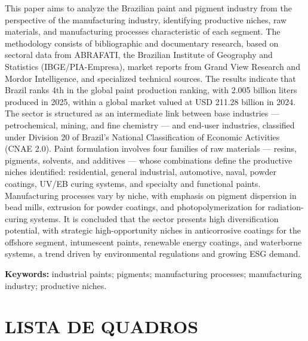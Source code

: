 \documentclass[
  12pt,
  a4paper,
  oneside,
  brazil,
  chapter=TITLE
]{article}
\makeatletter
\newcommand{\secbreak}{\clearpage}
\let\oldsection\section
\renewcommand{\section}{\secbreak\oldsection}
\renewcommand{\listofquadros}{%
  \section*{LISTA DE QUADROS}%
  \@starttoc{loq}%
}
\makeatother
\begin{document}
\vspace{1em}
\noindent
This paper aims to analyze the Brazilian paint and pigment industry from the perspective of
the manufacturing industry, identifying productive niches, raw materials, and manufacturing
processes characteristic of each segment. The methodology consists of bibliographic and
documentary research, based on sectoral data from ABRAFATI, the Brazilian Institute of
Geography and Statistics (IBGE/PIA-Empresa), market reports from Grand View Research and
Mordor Intelligence, and specialized technical sources. The results indicate that Brazil
ranks 4th in the global paint production ranking, with 2.005 billion liters produced in 2025,
within a global market valued at USD 211.28 billion in 2024. The sector is structured as an
intermediate link between base industries --- petrochemical, mining, and fine chemistry --- and
end-user industries, classified under Division 20 of Brazil's National Classification of
Economic Activities (CNAE 2.0). Paint formulation involves four families of raw materials ---
resins, pigments, solvents, and additives --- whose combinations define the productive niches
identified: residential, general industrial, automotive, naval, powder coatings, UV/EB curing
systems, and specialty and functional paints. Manufacturing processes vary by niche, with
emphasis on pigment dispersion in bead mills, extrusion for powder coatings, and
photopolymerization for radiation-curing systems. It is concluded that the sector presents
high diversification potential, with strategic high-opportunity niches in anticorrosive
coatings for the offshore segment, intumescent paints, renewable energy coatings, and
waterborne systems, a trend driven by environmental regulations and growing ESG demand.

\vspace{1em}
\noindent\textbf{Keywords:} industrial paints; pigments; manufacturing processes; manufacturing industry; productive niches.

\clearpage
\thispagestyle{empty}
\listofquadros

\clearpage
\thispagestyle{empty}
\tableofcontents
\end{document}
